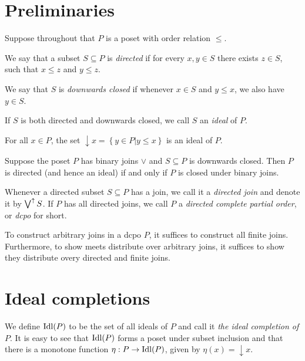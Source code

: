 \section{Preliminaries}
Suppose throughout that \(P\) is a poset with order relation \(\leq\).
\begin{definition}
  We say that a subset \(S \subseteq P\) is \emph{directed} if for every \(x, y \in S\) there exists \(z \in S\), such that \(x \leq z\) and \(y \leq z\).
  
  We say that \(S\) is \emph{downwards closed} if whenever \(x \in S\) and \(y \leq x\), we also have \(y \in S\).

  If \(S\) is both directed and downwards closed, we call \(S\) an \emph{ideal} of \(P\).
\end{definition}

\begin{lemma}
  For all \(x \in P\), the set \(\downarrow x = \left\{y \in P \vert y \leq x\right\}\) is an ideal of \(P\).
\end{lemma}

\begin{lemma}
  Suppose the poset \(P\) has binary joins \(\vee\) and \(S \subseteq P\) is downwards closed.
  Then \(P\) is directed (and hence an ideal) if and only if \(P\) is closed under binary joins. 
\end{lemma}

\begin{definition}
  Whenever a directed subset \(S \subseteq P\) has a join, we call it a \emph{directed join} and denote it by \(\bigvee^{\uparrow} S\). If \(P\) has all directed joins, we call \(P\) a \emph{directed complete partial order}, or \emph{dcpo} for short.
\end{definition}

\begin{lemma}
  To construct arbitrary joins in a dcpo \(P\), it suffices to construct all finite joins. Furthermore, to show meets distribute over arbitrary joins, it suffices to show they distribute overy directed and finite joins.
\end{lemma}

\section{Ideal completions}

\begin{definition}
  We define \(\operatorname{Idl}(P)\) to be the set of all ideals of \(P\) and call it \emph{the ideal completion of \(P\)}. It is easy to see that \(\operatorname{Idl}(P)\) forms a poset under subset inclusion and that there is a monotone function \(\eta : P \to \operatorname{Idl}(P)\), given by \(\eta(x) = \downarrow x\).
\end{definition}


